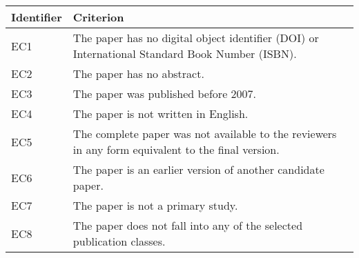 \begin{screenonly}
\begin{table}[h]
	\begin{tabular} {l p{10cm} }
		\hline
		Identifier & Criterion \\
		\hline
		EC1 & The paper has no digital object identifier (DOI) or International Standard Book Number (ISBN).\\
		EC2 & The paper has no abstract.\\
		EC3 & The paper was published before 2007.\\
		EC4 & The paper is not written in English.\\
		EC5 & The complete paper was not available to the reviewers in any form equivalent to the final version.\\
		EC6 & The paper is an earlier version of another candidate paper. \\
		EC7 & The paper is not a primary study. \\
		EC8 & The paper does not fall into any of the selected publication classes. \\
		\hline
	\end{tabular}
\end{table}
\end{screenonly}
